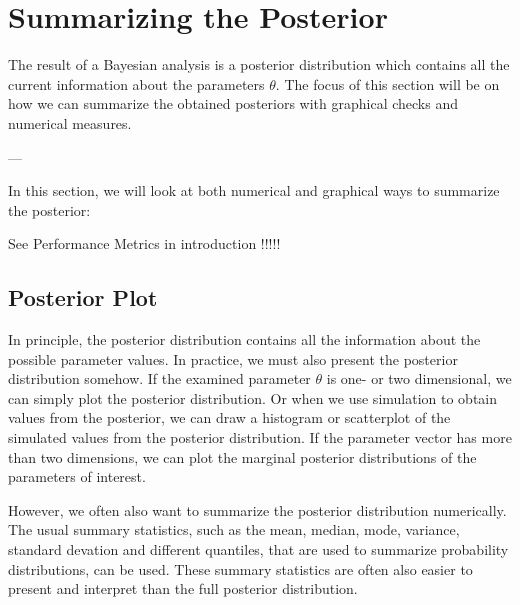\section{Summarizing the Posterior}

The result of a Bayesian analysis is a posterior distribution which contains all the current information about the parameters $\theta$. The focus of this section will be on how we can summarize the obtained posteriors with graphical checks and numerical measures.

---

In this section, we will look at both numerical and graphical ways to summarize the posterior:

See Performance Metrics in introduction !!!!!


\subsection{Posterior Plot}

In principle, the posterior distribution contains all the information about the possible parameter values. In practice, we must also present the posterior distribution somehow. If the examined parameter $\theta$
  is one- or two dimensional, we can simply plot the posterior distribution. Or when we use simulation to obtain values from the posterior, we can draw a histogram or scatterplot of the simulated values from the posterior distribution. If the parameter vector has more than two dimensions, we can plot the marginal posterior distributions of the parameters of interest.
  
 However, we often also want to summarize the posterior distribution numerically. The usual summary statistics, such as the mean, median, mode, variance, standard devation and different quantiles, that are used to summarize probability distributions, can be used. These summary statistics are often also easier to present and interpret than the full posterior distribution.

